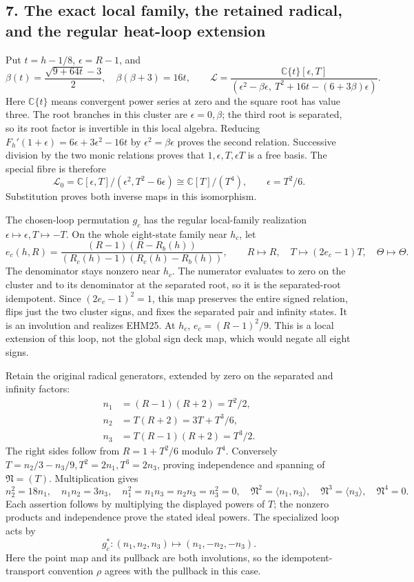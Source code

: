 \documentclass[
  10pt,
  a4paper,
]{article}
\begin{document}
\subsection{7. The exact local family, the retained radical, and the
regular heat-loop
extension}\label{the-exact-local-family-the-retained-radical-and-the-regular-heat-loop-extension}

Put \(t=h-1/8\), \(\epsilon=R-1\), and \[
\beta(t)=\frac{\sqrt{9+64t}-3}{2},\quad\beta(\beta+3)=16t,
\qquad
\mathscr L=\frac{\mathbb C\{t\}[\epsilon,T]}
{(\epsilon^2-\beta\epsilon,\ T^2+16t-(6+3\beta)\epsilon)}.
\tag{EHM27}
\] Here \(\mathbb C\{t\}\) means convergent power series at zero and the
square root has value three. The root branches in this cluster are
\(\epsilon=0,\beta\); the third root is separated, so its root factor is
invertible in this local algebra. Reducing
\(F_h'(1+\epsilon)=6\epsilon+3\epsilon^2-16t\) by
\(\epsilon^2=\beta\epsilon\) proves the second relation. Successive
division by the two monic relations proves that
\(1,\epsilon,T,\epsilon T\) is a free basis. The special fibre is
therefore \[
\mathscr L_0=\mathbb C[\epsilon,T]/(\epsilon^2,T^2-6\epsilon)
\cong\mathbb C[T]/(T^4),\qquad\epsilon=T^2/6.
\tag{EHM28}
\] Substitution proves both inverse maps in this isomorphism.

The chosen-loop permutation \(g_c\) has the regular local-family
realization \(\epsilon\mapsto\epsilon,T\mapsto-T\). On the whole
eight-state family near \(h_c\), let \[
e_c(h,R)=\frac{(R-1)(R-R_b(h))}{(R_c(h)-1)(R_c(h)-R_b(h))},
\qquad R\mapsto R,\quad T\mapsto(2e_c-1)T,\quad\Theta\mapsto\Theta.
\tag{EHM29}
\] The denominator stays nonzero near \(h_c\). The numerator evaluates
to zero on the cluster and to its denominator at the separated root, so
it is the separated-root idempotent. Since \((2e_c-1)^2=1\), this map
preserves the entire signed relation, flips just the two cluster signs,
and fixes the separated pair and infinity states. It is an involution
and realizes EHM25. At \(h_c\), \(e_c=(R-1)^2/9\). This is a local
extension of this loop, not the global sign deck map, which would negate
all eight signs.

Retain the original radical generators, extended by zero on the
separated and infinity factors: \[
\begin{aligned}
n_1&=(R-1)(R+2)=T^2/2,\\
n_2&=T(R+2)=3T+T^3/6,\\
n_3&=T(R-1)(R+2)=T^3/2.
\end{aligned}
\tag{EHM30}
\] The right sides follow from \(R=1+T^2/6\) modulo \(T^4\). Conversely
\(T=n_2/3-n_3/9,T^2=2n_1,T^3=2n_3\), proving independence and spanning
of \(\mathfrak N=(T)\). Multiplication gives \[
n_2^2=18n_1,\quad n_1n_2=3n_3,\quad
n_1^2=n_1n_3=n_2n_3=n_3^2=0,
\quad\mathfrak N^2=\langle n_1,n_3\rangle,\quad
\mathfrak N^3=\langle n_3\rangle,\quad\mathfrak N^4=0.
\tag{EHM31}
\] Each assertion follows by multiplying the displayed powers of \(T\);
the nonzero products and independence prove the stated ideal powers. The
specialized loop acts by \[
g_c^*: (n_1,n_2,n_3)\longmapsto(n_1,-n_2,-n_3).
\tag{EHM32}
\] Here the point map and its pullback are both involutions, so the
idempotent-transport convention \(\rho\) agrees with the pullback in
this case.
\end{document}
